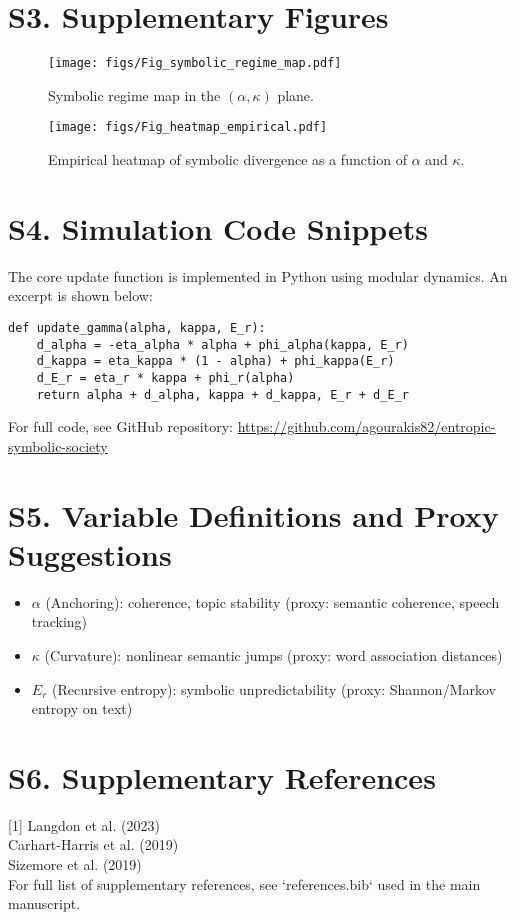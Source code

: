 \documentclass[12pt]{article}
\begin{document}
\section*{S3. Supplementary Figures}

\begin{figure}[h]
\centering
\texttt{[image: figs/Fig\_symbolic\_regime\_map.pdf]}
\caption{Symbolic regime map in the $(\alpha, \kappa)$ plane.}
\end{figure}

\begin{figure}[h]
\centering
\texttt{[image: figs/Fig\_heatmap\_empirical.pdf]}
\caption{Empirical heatmap of symbolic divergence as a function of $\alpha$ and $\kappa$.}
\end{figure}

\section*{S4. Simulation Code Snippets}

The core update function is implemented in Python using modular dynamics. An excerpt is shown below:

\begin{verbatim}
def update_gamma(alpha, kappa, E_r):
    d_alpha = -eta_alpha * alpha + phi_alpha(kappa, E_r)
    d_kappa = eta_kappa * (1 - alpha) + phi_kappa(E_r)
    d_E_r = eta_r * kappa + phi_r(alpha)
    return alpha + d_alpha, kappa + d_kappa, E_r + d_E_r
\end{verbatim}

For full code, see GitHub repository: \url{https://github.com/agourakis82/entropic-symbolic-society}

\section*{S5. Variable Definitions and Proxy Suggestions}

\begin{itemize}
    \item $\alpha$ (Anchoring): coherence, topic stability (proxy: semantic coherence, speech tracking)
    \item $\kappa$ (Curvature): nonlinear semantic jumps (proxy: word association distances)
    \item $E_r$ (Recursive entropy): symbolic unpredictability (proxy: Shannon/Markov entropy on text)
\end{itemize}

\section*{S6. Supplementary References}

[1] Langdon et al. (2023) \\
[2] Carhart-Harris et al. (2019) \\
[3] Sizemore et al. (2019) \\
For full list of supplementary references, see `references.bib` used in the main manuscript. \\
\end{document}
